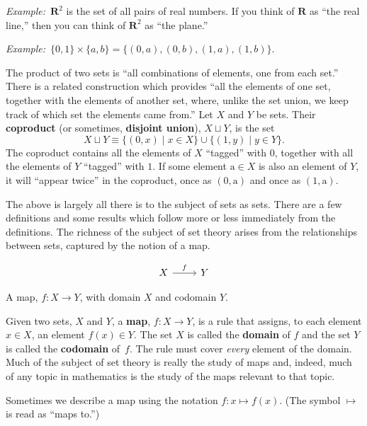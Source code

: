 \documentclass[12pt, a4paper]{article}
\newcommand{\defn}[1]{\textbf{#1}}
\newcommand{\set}[1]{\mathbold{#1}}
\newcommand{\eg}{\emph{Example:}\relax}
\begin{document}
\eg\ $\set{R}^2$ is the set of all pairs of real numbers. If you think
of $\set{R}$ as ``the real line,'' then you can think of $\set{R}^2$
as ``the plane.''

\eg\ $\{0,1\}\times\{a, b\} = \{(0,a), (0,b), (1,a), (1,b)\}$. 

The product of two sets is “all combinations of elements, one from
each set.” There is a related construction which provides “all the
elements of one set, together with the elements of another set, where,
unlike the set union, we keep track of which set the elements came
from.” Let $X$ and $Y$ be sets. Their \defn{coproduct} (or sometimes,
\defn{disjoint union}), $X \sqcup Y$, is the set
\begin{equation*}
  X \sqcup Y \equiv \{(0,x) \mid x\in X\} \cup \{(1, y)\mid y\in Y\}.
\end{equation*}
The coproduct contains all the elements of $X$ “tagged” with $0$,
together with all the elements of $Y$ “tagged” with $1$. If some
element $\text{a}\in X$ is also an element of $Y$, it will “appear twice” in the
coproduct, once as $(0,\text{a})$ and once as $(1,\text{a})$. 

The above is largely all there is to the subject of sets as
sets. There are a few definitions and some results which follow more
or less immediately from the definitions. The richness of the subject
of set theory arises from the relationships between sets, captured by
the notion of a map.

\begin{sidefigure}
  \[\begin{tikzcd}
    X \arrow[r, "f"] & Y
  \end{tikzcd}\]
  \caption{A map, $f\colon X\to Y$, with domain $X$ and codomain $Y$.}
\end{sidefigure}
Given two sets, $X$ and $Y$, a \defn{map}, $f\colon X \to Y$, is a rule
that assigns, to each element $x \in X$, an element $f(x) \in Y$. The set
$X$ is called the \defn{domain} of $f$ and the set $Y$ is called the
\defn{codomain} of~$f$. The rule must cover \emph{every} element of
the domain. Much of the subject of set theory is really the study of
maps and, indeed, much of any topic in mathematics is the study of the
maps relevant to that topic.

Sometimes we describe a map using the notation $f\colon x\mapsto f(x)$. (The
symbol $\mapsto$ is read as ``maps to.'')
\end{document}
